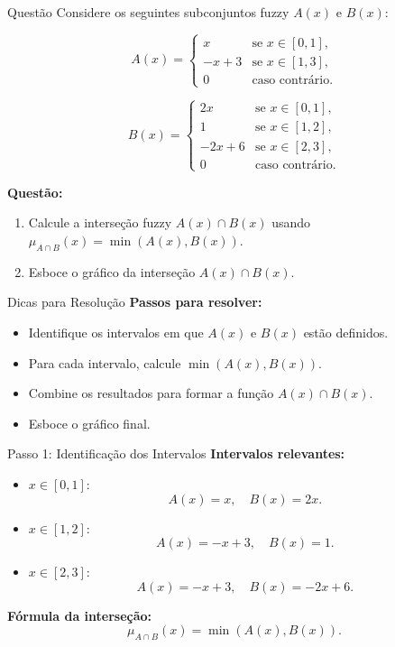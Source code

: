 \documentclass{beamer}
\begin{document}
\begin{frame}{Questão}
\footnotesize
Considere os seguintes subconjuntos fuzzy \( A(x) \) e \( B(x) \):

\[
A(x) =
\begin{cases}
x & \text{se } x \in [0, 1], \\
-x + 3 & \text{se } x \in [1, 3], \\
0 & \text{caso contrário}.
\end{cases}
\]

\[
B(x) =
\begin{cases}
2x & \text{se } x \in [0, 1], \\
1 & \text{se } x \in [1, 2], \\
-2x + 6 & \text{se } x \in [2, 3], \\
0 & \text{caso contrário}.
\end{cases}
\]

\textbf{Questão:}
\begin{enumerate}
    \item Calcule a interseção fuzzy \( A(x) \cap B(x) \) usando \( \mu_{A \cap B}(x) = \min(A(x), B(x)) \).
    \item Esboce o gráfico da interseção \( A(x) \cap B(x) \).
\end{enumerate}
\end{frame}

\begin{frame}{Dicas para Resolução}
\textbf{Passos para resolver:}
\begin{itemize}
    \item Identifique os intervalos em que \( A(x) \) e \( B(x) \) estão definidos.
    \item Para cada intervalo, calcule \( \min(A(x), B(x)) \).
    \item Combine os resultados para formar a função \( A(x) \cap B(x) \).
    \item Esboce o gráfico final.
\end{itemize}
\end{frame}

\begin{frame}{Passo 1: Identificação dos Intervalos}
\textbf{Intervalos relevantes:}
\begin{itemize}
    \item \( x \in [0, 1]: \)
    \[
    A(x) = x, \quad B(x) = 2x.
    \]
    \item \( x \in [1, 2]: \)
    \[
    A(x) = -x + 3, \quad B(x) = 1.
    \]
    \item \( x \in [2, 3]: \)
    \[
    A(x) = -x + 3, \quad B(x) = -2x + 6.
    \]
\end{itemize}

\textbf{Fórmula da interseção:}
\[
\mu_{A \cap B}(x) = \min(A(x), B(x)).
\]
\end{frame}
\end{document}
